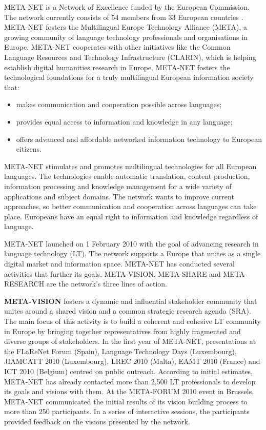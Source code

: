\documentclass[]{../../metanetpaper}
\begin{document}
\begin{multicols}{2}
META-NET is a Network of Excellence funded by the European Commission. The network currently consists of 54 members from 33 European countries \cite{rehm2011}. META-NET fosters the Multilingual Europe Technology Alliance (META), a growing community of language technology professionals and organisations in Europe. META-NET cooperates with other initiatives like the Common Language Resources and Technology Infrastructure (CLARIN), which is helping establish digital humanities research in Europe. META-NET fosters the technological foundations for a truly multilingual European information society that:

\begin{itemize}
\item makes communication and cooperation possible across languages;
\item provides equal access to information and knowledge in any language;
\item offers advanced and affordable networked information technology to European citizens.
\end{itemize}

META-NET stimulates and promotes multilingual technologies for all European languages. The technologies enable automatic translation, content production, information processing and knowledge management for a wide variety of applications and subject domains. The network wants to improve current approaches, so better communication and cooperation across languages can take place. Europeans have an equal right to information and knowledge regardless of language.

META-NET launched on 1 February 2010 with the goal of advancing research in language technology (LT). The network supports a Europe that unites as a single digital market and information space. META-NET has conducted several activities that further its goals. META-VISION, META-SHARE and META-RESEARCH are the network’s three lines of action.

\textbf{META-VISION} fosters a dynamic and influential stakeholder community that unites around a shared vision and a common strategic research agenda (SRA). The main focus of this activity is to build a coherent and cohesive LT community in Europe by bringing together representatives from highly fragmented and diverse groups of stakeholders. In the first year of META-NET, presentations at the FLaReNet Forum (Spain), Language Technology Days (Luxembourg), JIAMCATT 2010 (Luxembourg), LREC 2010 (Malta), EAMT 2010 (France) and ICT 2010 (Belgium) centred on public outreach. According to initial estimates, META-NET has already contacted more than 2,500 LT professionals to develop its goals and visions with them. At the META-FORUM 2010 event in Brussels, META-NET communicated the initial results of its vision building process to more than 250 participants. In a series of interactive sessions, the participants provided feedback on the visions presented by the network.


\end{multicols}
\end{document}
